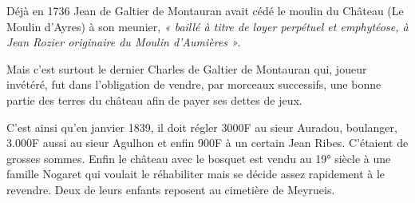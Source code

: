 \medskip

Déjà en 1736 Jean de Galtier de Montauran avait cédé le moulin du Château (Le Moulin
d’Ayres) à son meunier, \textit{« baillé à titre de loyer perpétuel et emphytéose, à Jean Rozier
originaire du Moulin d’Aumières ».}

\medskip

Mais c’est surtout le dernier Charles de Galtier de Montauran qui, joueur invétéré, fut dans
l’obligation de vendre, par morceaux successifs, une bonne partie des terres du château afin
de payer ses dettes de jeux.

\medskip

C’est ainsi qu’en janvier 1839, il doit régler 3000F au sieur Auradou, boulanger, 3.000F aussi
au sieur Agulhon et enfin 900F à un certain Jean Ribes. C’étaient de grosses sommes. Enfin le
château avec le bosquet est vendu au 19° siècle à une famille Nogaret qui voulait le
réhabiliter mais se décide assez rapidement à le revendre. Deux de leurs enfants reposent au
cimetière de Meyrueis.
